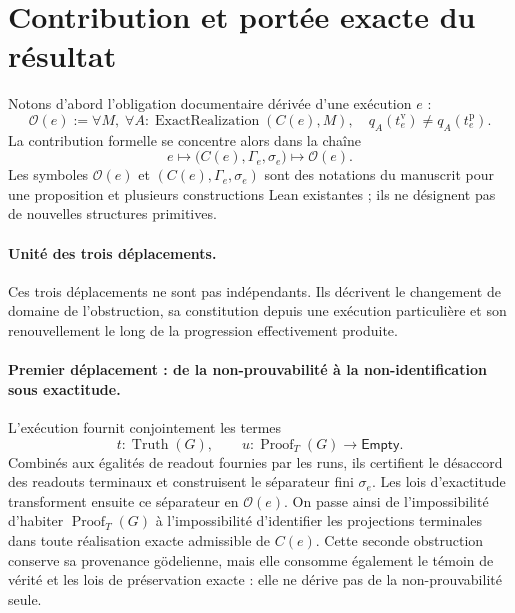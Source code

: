 \documentclass[11pt,a4paper]{article}
\newcommand{\Truth}{\operatorname{Truth}}
\newcommand{\Proof}{\operatorname{Proof}}
\newcommand{\ExactRealization}{\operatorname{ExactRealization}}
\newcommand{\Empty}{\mathsf{Empty}}
\theoremstyle{remark}
\begin{document}
\section{Contribution et portée exacte du résultat}

Notons d'abord l'obligation documentaire dérivée d'une exécution $e$ :
\[
\mathcal O(e):=
\forall M,\;\forall A:\ExactRealization(C(e),M),\quad
q_A(t_e^{\mathrm v})\neq q_A(t_e^{\mathrm p}).
\]
La contribution formelle se concentre alors dans la chaîne
\[
\boxed{
e\longmapsto\bigl(C(e),\Gamma_e,\sigma_e\bigr)
\longmapsto\mathcal O(e).
}
\]
Les symboles $\mathcal O(e)$ et $(C(e),\Gamma_e,\sigma_e)$ sont des notations
du manuscrit pour une proposition et plusieurs constructions Lean existantes ;
ils ne désignent pas de nouvelles structures primitives.

\paragraph{Unité des trois déplacements.}
Ces trois déplacements ne sont pas indépendants. Ils décrivent le changement
de domaine de l'obstruction, sa constitution depuis une exécution particulière
et son renouvellement le long de la progression effectivement produite.

\paragraph{Premier déplacement : de la non-prouvabilité à la
non-identification sous exactitude.}
L'exécution fournit conjointement les termes
\[
t:\Truth(G),
\qquad
u:\Proof_T(G)\longrightarrow\Empty.
\]
Combinés aux égalités de readout fournies par les runs, ils certifient le
désaccord des readouts terminaux et construisent le séparateur fini
$\sigma_e$. Les lois d'exactitude transforment ensuite ce séparateur en
$\mathcal O(e)$. On
passe ainsi de l'impossibilité d'habiter $\Proof_T(G)$ à l'impossibilité
d'identifier les projections terminales dans toute réalisation exacte
admissible de $C(e)$. Cette seconde obstruction conserve sa provenance
gödelienne, mais elle consomme également le témoin de vérité et les lois de
préservation exacte : elle ne dérive pas de la non-prouvabilité seule.
\end{document}
